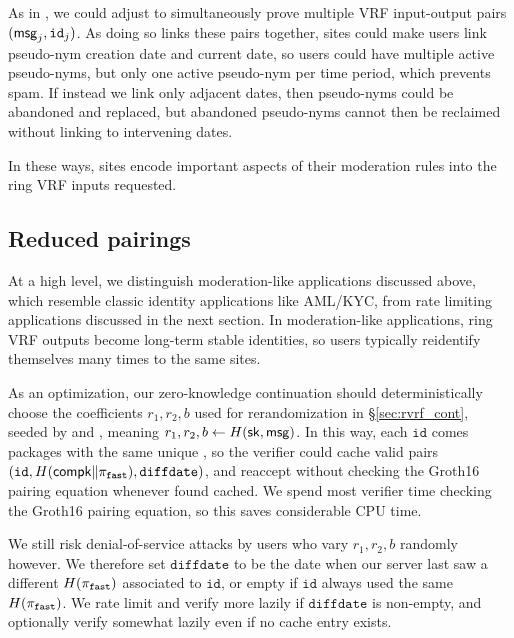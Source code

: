 As in \cite{PrivacyPass}, we could adjust \PedVRF to simultaneously
prove multiple VRF input-output pairs $(\mathsf{msg}_j,\mathtt{id}_j)$.
As doing so links these pairs together, sites could make users link
pseudo-nym creation date and current date, so users could have multiple
active pseudo-nyms, but only one active pseudo-nym per time period,
which prevents spam.
If instead we link only adjacent dates, then pseudo-nyms could
be abandoned and replaced, but abandoned pseudo-nyms cannot then
be reclaimed without linking to intervening dates.

In these ways, sites encode important aspects of their moderation rules
into the ring VRF inputs requested.  


\subsection{Reduced pairings}
\label{sec:reduced_pairings}

At a high level, we distinguish moderation-like applications discussed
above, which resemble classic identity applications like AML/KYC, from
rate limiting applications discussed in the next section. 
%
In moderation-like applications, ring VRF outputs become long-term
stable identities, so users typically reidentify themselves many times
to the same sites.

As an optimization, our zero-knowledge continuation
should deterministically choose the coefficients $r_1,r_2,b$ used for
rerandomization in \S\ref{sec:rvrf_cont},
 seeded by \msg and \sk, meaning $r_1,r_2,b \leftarrow H(\mathsf{sk},\mathsf{msg})$. 
%
In this way, each $\mathtt{id}$ comes packages with the same unique %
\pifast, so the verifier could cache valid pairs
$(\mathtt{id},H(\mathsf{compk} \| \pi_{\mathtt{fast}}),\mathtt{diffdate})$, and reaccept \pifast
without checking the Groth16 pairing equation whenever found cached.
%
We spend most verifier time checking the Groth16 pairing equation, so
this saves considerable CPU time. %

We still risk denial-of-service attacks by users who vary $r_1,r_2,b$ 
randomly however.  We therefore set $\mathtt{diffdate}$ to be the date
when our server last saw a different $H(\pi_{\mathtt{fast}})$ associated to
$\mathtt{id}$, or empty if $\mathtt{id}$ always used the same $H(\pi_{\mathtt{fast}})$.
We rate limit and verify more lazily if $\mathtt{diffdate}$ is non-empty,
and optionally verify somewhat lazily even if no cache entry exists.

